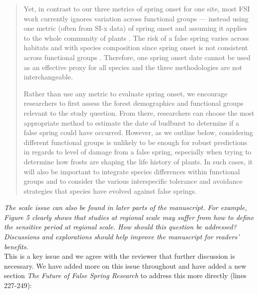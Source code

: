 \documentclass[11pt,a4paper]{article}
\begin{document}
\begin{quotation}
Yet, in contrast to our three metrics of spring onset for one site, most FSI work currently ignores variation across functional groups --- instead using one metric (often from SI-x data) of spring onset and assuming it applies to the whole community of plants \citep{Allstadt2015, Marino2011, Mehdipoor2017, Peterson2014}. The risk of a false spring varies across habitats and with species composition since spring onset is not consistent across functional groups \citep{Martin2010}. Therefore, one spring onset date cannot be used as an effective proxy for all species and the three methodologies are not interchangeable. 

Rather than use any metric to evaluate spring onset, we encourage researchers to first assess the forest demographics and functional groups relevant to the study question. From there, researchers can choose the most appropriate method to estimate the date of budburst to determine if a false spring could have occurred. However, as we outline below, considering different functional groups is unlikely to be enough for robust predictions in regards to level of damage from a false spring, especially when trying to determine how frosts are shaping the life history of plants. In such cases, it will also be important to integrate species differences within functional groups and to consider the various interspecific tolerance and avoidance strategies that species have evolved against false springs. 
\end{quotation}


\textit{The scale issue can also be found in later parts of the manuscript. For example, Figure 5 clearly shows that studies at regional scale may suffer from how to define the sensitive period at regional scale. How should this question be addressed? Discussions and explorations should help improve the manuscript for readers' benefits.} \\

This is a key issue and we agree with the reviewer that further discussion is necessary. We have added more on this issue throughout and have added a new section \textit{The Future of False Spring Research} to address this more directly (lines 227-249):\\
\end{document}
